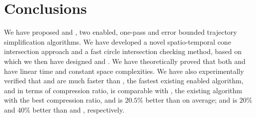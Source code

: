 \section{Conclusions} %

We have proposed \cist and \cista, two \sed enabled, one-pass and error bounded trajectory simplification algorithms.
%
We have developed a novel spatio-temporal cone intersection approach and a fast circle intersection checking method, based on which we then have designed \cist and \cista.
%
We have theoretically proved that both \cist and \cista have linear time and constant space complexities.
%
We have also experimentally verified that \cist and \cista are much faster than \squishe, the fastest existing \sed enabled \lsa algorithm,
and in terms of compression ratio, \cist is \textcolor[rgb]{1.00,0.00,0.00}{comparable} with \dpa, the existing \lsa algorithm with the best compression ratio, and is $20.5\%$ better than \squishe on average; and \cista is {$20\%$} and {$40\%$} better than \dps and \squishe, respectively.
